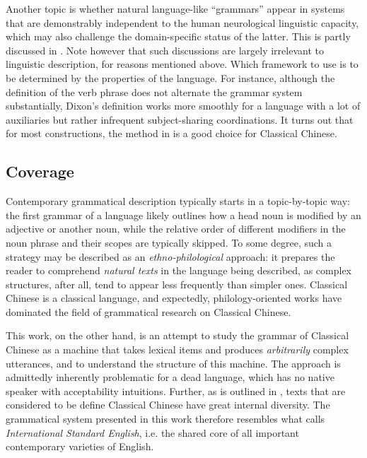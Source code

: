 \documentclass[UTF8, a4paper, oneside, scheme=plain, 12pt]{ctexrep}
\newcommand*{\term}[1]{\emph{#1}}
\begin{document}
{{    Another topic is whether natural language-like ``grammars'' appear in systems that are demonstrably independent to the human neurological linguistic capacity,
    which may also challenge the domain-specific status of the latter.
    This is partly discussed in .
    Note however that such discussions are largely irrelevant to linguistic description,
    for reasons mentioned above.
}
Which framework to use is to be determined by the properties of the language.
For instance, although the definition of the verb phrase does not alternate the grammar system substantially,
Dixon's definition works more smoothly for a language with a lot of auxiliaries but rather infrequent subject-sharing coordinations.
It turns out that for most constructions, the method in \citet{cgel} is a good choice for Classical Chinese.


}

\subsection{Coverage}\label{sec:introduction.theory.coverage}

Contemporary grammatical description typically starts in a topic-by-topic way:
the first grammar of a language likely outlines how a head noun is modified by an adjective or another noun,
while the relative order of different modifiers in the noun phrase and their scopes are typically skipped.
To some degree, such a strategy may be described as an \emph{ethno-philological} approach:
it prepares the reader to comprehend \emph{natural texts} in the language being described,
as complex structures, after all, tend to appear less frequently than simpler ones.
Classical Chinese is a classical language, and expectedly, philology-oriented works have dominated the field of grammatical research on Classical Chinese.

This work, on the other hand, is an attempt to study the grammar of Classical Chinese as a machine that takes lexical items and produces \emph{arbitrarily} complex utterances,
and to understand the structure of this machine.
The approach is admittedly inherently problematic for a dead language,
which has no native speaker with acceptability intuitions.
Further, as is outlined in ,
texts that are considered to be define Classical Chinese have great internal diversity.
The grammatical system presented in this work therefore resembles what \citet{cgel} calls \term{International Standard English},
i.e. the shared core of all important contemporary varieties of English.
\end{document}
